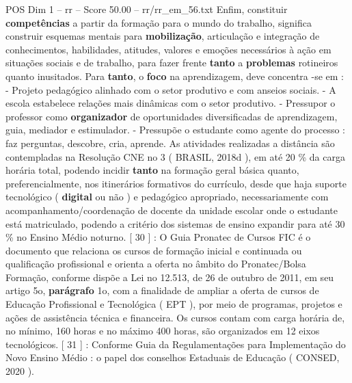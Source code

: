 \begin{textsample}{POS Dim 1 – rr – Score 50.00 – rr/rr\_em\_56.txt}
Enfim, constituir \textbf{competências} a partir da formação para o mundo do trabalho, significa construir esquemas mentais para \textbf{mobilização}, articulação e integração de conhecimentos, habilidades, atitudes, valores e emoções necessários à ação em situações sociais e de trabalho, para fazer frente \textbf{tanto} a \textbf{problemas} rotineiros quanto inusitados.
Para \textbf{tanto}, o \textbf{foco} na aprendizagem, deve concentra -se em : - Projeto pedagógico alinhado com o setor produtivo e com anseios sociais. - A escola estabelece relações mais dinâmicas com o setor produtivo. - Pressupor o professor como \textbf{organizador} de oportunidades diversificadas de aprendizagem, guia, mediador e estimulador. - Pressupõe o estudante como agente do processo : faz perguntas, descobre, cria, aprende.
As atividades realizadas a distância são contempladas na Resolução CNE no 3 ( BRASIL, 2018d ), em até 20 \% da carga horária total, podendo incidir \textbf{tanto} na formação geral básica quanto, preferencialmente, nos itinerários formativos do currículo, desde que haja suporte tecnológico ( \textbf{digital} ou não ) e pedagógico apropriado, necessariamente com acompanhamento/coordenação de docente da unidade escolar onde o estudante está matriculado, podendo a critério dos sistemas de ensino expandir para até 30 \% no Ensino Médio noturno. [ 30 ] : O Guia Pronatec de Cursos FIC é o documento que relaciona os cursos de formação inicial e continuada ou qualificação profissional e orienta a oferta no âmbito do Pronatec/Bolsa Formação, conforme dispõe a Lei no 12.513, de 26 de outubro de 2011, em seu artigo 5o, \textbf{parágrafo} 1o, com a finalidade de ampliar a oferta de cursos de Educação Profissional e Tecnológica ( EPT ), por meio de programas, projetos e ações de assistência técnica e financeira.
Os cursos contam com carga horária de, no mínimo, 160 horas e no máximo 400 horas, são organizados em 12 eixos tecnológicos. [ 31 ] : Conforme Guia da Regulamentações para Implementação do Novo Ensino Médio : o papel dos conselhos Estaduais de Educação ( CONSED, 2020 ).

\end{textsample}
